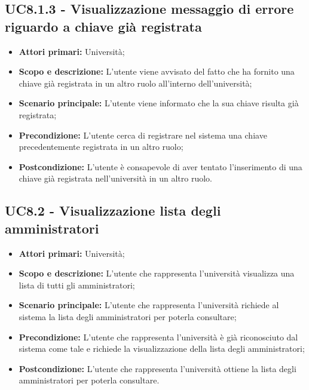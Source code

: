\documentclass[AnalisiDeiRequisiti.tex]{subfiles}
\begin{document}
\subsection{UC8.1.3 - Visualizzazione messaggio di errore riguardo a chiave già registrata}
\begin{itemize}
	\item \textbf{Attori primari:} Università;\\
	\item \textbf{Scopo e descrizione:} L'utente viene avvisato del fatto che ha fornito una chiave già registrata in un altro ruolo all'interno dell'università;\\
	\item \textbf{Scenario principale:} L'utente viene informato che la sua chiave risulta già registrata;\\
	\item \textbf{Precondizione:} L'utente cerca di registrare nel sistema una chiave precedentemente registrata in un altro ruolo;\\
	\item \textbf{Postcondizione:} L'utente è consapevole di aver tentato l'inserimento di una chiave già registrata nell'università in un altro ruolo.\\
\end{itemize}


\subsection{UC8.2 - Visualizzazione lista degli amministratori}
	\begin{itemize}
	\item \textbf{Attori primari:} Università;\\
	\item \textbf{Scopo e descrizione:} L'utente che rappresenta l'università visualizza una lista di tutti gli amministratori;\\
	\item \textbf{Scenario principale:} L'utente che rappresenta l'università richiede al sistema la lista degli amministratori per poterla consultare;\\
	\item \textbf{Precondizione:} L'utente che rappresenta l'università è già riconosciuto dal sistema come tale e richiede la visualizzazione della lista degli amministratori;\\
	\item \textbf{Postcondizione:} L'utente che rappresenta l'università ottiene la lista degli amministratori per poterla consultare.\\
	\end{itemize}
\end{document}
